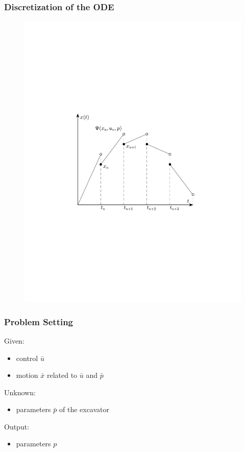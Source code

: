 \begin{frame}
	\frametitle{Discretization of the ODE}
	
	\begin{figure}[bth]
	  \begin{center}
	    \includegraphics[trim=1cm 5cm 0cm 8cm, clip=true, width=\linewidth]{img/multShootPlot}
	  \end{center}
	\end{figure}
\end{frame}

\begin{frame}
    \frametitle{Problem Setting}
    Given:
    \begin{itemize}
        \item{control $\bar{u}$}
        \item{motion $\bar{x}$ related to $\bar{u}$ and $\bar{p}$}
    \end{itemize}

    Unknown:
    \begin{itemize}
        \item{parameters $\bar{p}$ of the excavator}
    \end{itemize}

    Output:
    \begin{itemize}
        \item{parameters $p$}
    \end{itemize}
\end{frame}

